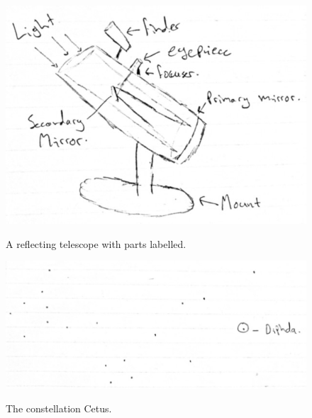 \documentclass[11pt]{article}
\begin{document}
\begin{figure}[H]
\caption{A reflecting telescope with parts labelled.}
\begin{center}
\includegraphics[scale=0.8]{figures/telescope.jpg}
\label{fig:telescope}
\end{center}
\end{figure}

\begin{figure}[H]
\caption{The constellation Cetus.}
\begin{center}
\includegraphics[scale=0.7]{figures/cetus.jpg}
\label{fig:cetus}
\end{center}
\end{figure}
\end{document}
